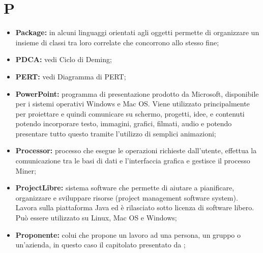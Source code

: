 %


\section*{\Huge P} %
\label{sec:p}
	\begin{itemize}
		\item \textbf{Package:} in alcuni linguaggi orientati agli oggetti permette di organizzare un insieme di classi tra loro correlate che concorrono allo stesso fine;
		\item \textbf{PDCA:} vedi Ciclo di Deming;		
		\item \textbf{PERT:} vedi Diagramma di PERT;		
		\item \textbf{PowerPoint:} programma di presentazione prodotto da Microsoft, disponibile per i sistemi operativi Windows e Mac OS. Viene utilizzato principalmente per proiettare e quindi comunicare su schermo, progetti, idee, e contenuti potendo incorporare testo, immagini, grafici, filmati, audio e potendo presentare tutto questo tramite l'utilizzo di semplici animazioni;
		\item \textbf{Processor:} processo che esegue le operazioni richieste dall'utente, effettua la comunicazione tra le basi di dati e l'interfaccia grafica e gestisce il processo Miner;
		\item \textbf{ProjectLibre:} sistema software che permette di aiutare a pianificare, organizzare e sviluppare risorse (project management software system). Lavora sulla piattaforma Java ed è rilasciato sotto licenza di software libero. Può essere utilizzato su Linux, Mac OS e Windows;		
		\item \textbf{Proponente:} colui che propone un lavoro ad una persona, un gruppo o un'azienda, in questo caso il capitolato presentato da \proposerName;
	\end{itemize}
\pagebreak

